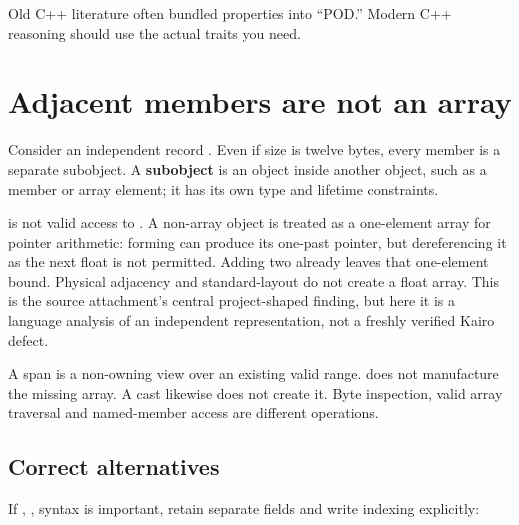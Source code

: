 Old C++ literature often bundled properties into ``POD.'' Modern C++ reasoning should use the actual traits you need.

\section{Adjacent members are not an array}\label{01-foundations-i-ch003-adjacent-members-are-not-an-array}

\hypertarget{01-foundations-i-ch003-adjacent-members-are-not-an-array}{}

Consider an independent record . Even if size is twelve bytes, every member is a separate subobject. A \textbf{subobject} is an object inside another object, such as a member or array element; it has its own type and lifetime constraints.

 is not valid access to . A non-array object is treated as a one-element array for pointer arithmetic: forming  can produce its one-past pointer, but dereferencing it as the next float is not permitted. Adding two already leaves that one-element bound. Physical adjacency and standard-layout do not create a float array. This is the source attachment's central project-shaped finding, but here it is a language analysis of an independent representation, not a freshly verified Kairo defect.

A span is a non-owning view over an existing valid range.  does not manufacture the missing array. A cast likewise does not create it. Byte inspection, valid array traversal and named-member access are different operations.

\subsection{Correct alternatives}\label{01-foundations-i-ch003-correct-alternatives}

\hypertarget{01-foundations-i-ch003-correct-alternatives}{}

If , ,  syntax is important, retain separate fields and write indexing explicitly:

